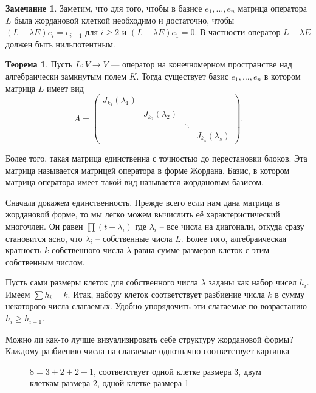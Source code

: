 \documentclass[10pt,a4paper,oneside]{book}
\theoremstyle{definition}
\newtheorem*{rem}{Замечание}
\newtheorem{thm}{Теорема}
\def\thrm{\begin{thm}}
\def\ethrm{\end{thm}}
\def\rm{\begin{rem}}
\def\erm{\end{rem}}
\begin{document}
\rm Заметим, что для того, чтобы в базисе $e_1,\dots,e_n$ матрица оператора $L$ была жордановой клеткой необходимо и достаточно, чтобы $(L-\lambda E)e_i=e_{i-1}$ для $i\geq 2$ и $(L-\lambda E)e_1=0$. В частности оператор $L-\lambda E$ должен быть нильпотентным.
\erm







\thrm Пусть $L\colon V \to V$ --- оператор на конечномерном пространстве над алгебраически замкнутым полем $K$.
Тогда существует базис $e_1,\dots, e_n$ в котором матрица $L$ имеет вид
$$A=\begin{pmatrix}
J_{k_1}(\lambda_1) &&&\\
& J_{k_2}(\lambda_2) &&\\
&& \ddots& \\
&&& J_{k_s}(\lambda_s)

\end{pmatrix}.
$$

Более того, такая матрица единственна с точностью до перестановки блоков. Эта матрица называется матрицей оператора в форме Жордана. Базис, в котором матрица оператора имеет такой вид называется жордановым базисом.
\ethrm
\proof

Сначала докажем единственность. Прежде всего если нам дана матрица в жордановой форме, то мы легко можем вычислить её характеристический многочлен. Он равен $\prod (t-\lambda_i)$ где $\lambda_i$ -- все числа на диагонали, откуда сразу становится ясно, что $\lambda_i$ -- собственные числа $L$. Более того, алгебраическая кратность
$k$ собственного числа $\lambda$ равна сумме размеров клеток с этим собственным числом.

Пусть сами размеры клеток для собственного числа $\lambda$ заданы как набор чисел $h_i$. Имеем
$\sum h_i =k.$
Итак, набору клеток соответствует разбиение числа $k$ в сумму некоторого числа слагаемых. Удобно упорядочить эти слагаемые по возрастанию $h_i\geq h_{i+1}$.

Можно ли как-то лучше визуализировать себе структуру жордановой формы?
Каждому разбиению числа на слагаемые однозначно соответствует картинка


\begin{figure}[hhh]
\begin{center}
\end{center}
\caption{$8=3+2+2+1$, соответствует одной клетке размера 3, двум клеткам размера 2, одной клетке размера 1}
\end{figure}
\end{document}
